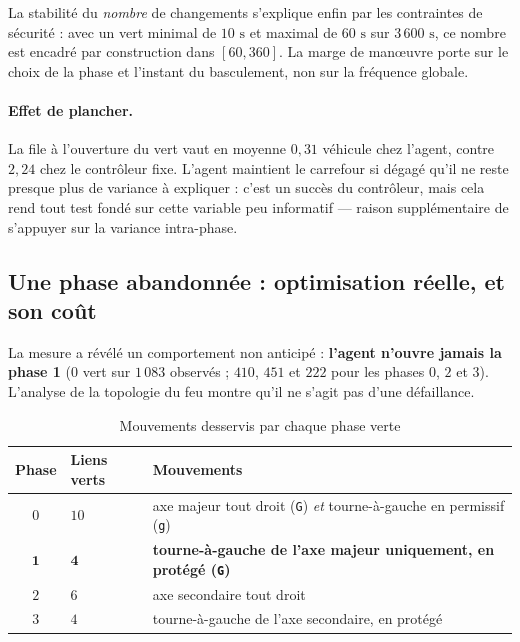 \documentclass[11pt,a4paper]{article}
\begin{document}
La stabilité du \emph{nombre} de changements s'explique enfin par les contraintes de
sécurité : avec un vert minimal de $10\text{ s}$ et maximal de $60\text{ s}$ sur
$3\,600\text{ s}$, ce nombre est encadré par construction dans $[60, 360]$. La marge de
manœuvre porte sur le choix de la phase et l'instant du basculement, non sur la
fréquence globale.

\paragraph{Effet de plancher.} La file à l'ouverture du vert vaut en moyenne
$0{,}31$ véhicule chez l'agent, contre $2{,}24$ chez le contrôleur fixe. L'agent
maintient le carrefour si dégagé qu'il ne reste presque plus de variance à expliquer :
c'est un succès du contrôleur, mais cela rend tout test fondé sur cette variable peu
informatif --- raison supplémentaire de s'appuyer sur la variance intra-phase.

\subsection{Une phase abandonnée : optimisation réelle, et son coût}
\label{sec:phase1}

La mesure a révélé un comportement non anticipé : \textbf{l'agent n'ouvre jamais la
phase 1} ($0$ vert sur $1\,083$ observés ; $410$, $451$ et $222$ pour les phases $0$,
$2$ et $3$). L'analyse de la topologie du feu montre qu'il ne s'agit pas d'une
défaillance.

\begin{table}[H]
\centering
\caption{Mouvements desservis par chaque phase verte}
\label{tab:phases}
\vspace{0.2cm}
\begin{tabular}{clp{7.4cm}}
\toprule
\textbf{Phase} & \textbf{Liens verts} & \textbf{Mouvements} \\
\midrule
$0$ & $10$ & axe majeur tout droit (\texttt{G}) \emph{et} tourne-à-gauche en permissif (\texttt{g}) \\
$\mathbf{1}$ & $\mathbf{4}$ & \textbf{tourne-à-gauche de l'axe majeur uniquement, en protégé (\texttt{G})} \\
$2$ & $6$ & axe secondaire tout droit \\
$3$ & $4$ & tourne-à-gauche de l'axe secondaire, en protégé \\
\bottomrule
\end{tabular}
\end{table}
\end{document}
